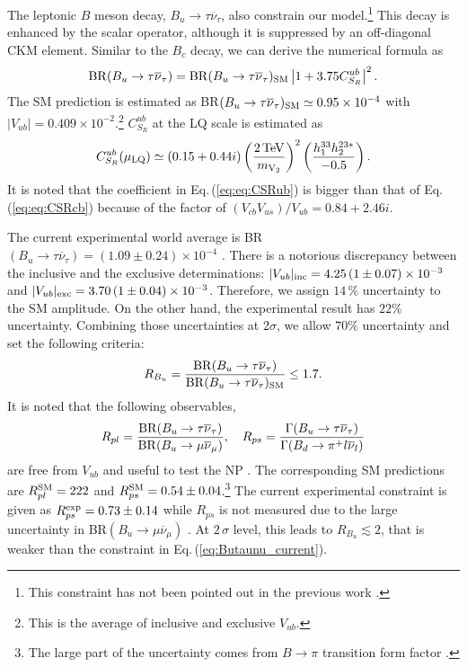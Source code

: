 \documentclass[12pt, a4paper]{article}
\numberwithin{equation}{section} %
\newcommand{\ov}{\overline}
\newcommand{\1}{\mbox{1}\hspace{-0.25em}\mbox{l}}
\begin{document}
The leptonic $B$ meson decay, $B_u\to \tau\ov\nu_\tau$, also constrain our model.\footnote{ This constraint has not been pointed out in the previous work \cite{Cheung:2022zsb}.}
This decay is enhanced by the scalar operator, although it is suppressed by an off-diagonal CKM element.
Similar to the $B_c$ decay, we can derive the numerical formula as 
\begin{align}
 \label{eq:Bu}
{\rm{BR}}(B_u\to \tau\overline\nu_\tau) ={\rm{BR}}(B_u\to \tau\overline\nu_\tau)_{\rm SM}\left| 1 + 3.75 C^{ub}_{S_R} \right|^2.
\end{align}
The SM prediction is estimated as BR$(B_u\to \tau\ov\nu_\tau)_{\rm SM}\simeq 0.95 \times 10^{-4}$ with $|V_{ub}|=0.409\times 10^{-2}$.\footnote{This is the average of inclusive and exclusive $V_{ub}$.}
$C_{S_R}^{ub}$ at the LQ scale is estimated as
\begin{align}
    C_{S_R}^{ub}(\mu_{\rm{LQ}})\simeq(0.15+0.44i)\left(\frac{2\,{\rm{TeV}}}{m_{\rm{V}_2}}\right)^2\left(\frac{h_1^{33}h_2^{23*}}{-0.5}\right).
    \label{eq:eq:CSRub}
\end{align}
It is noted that the coefficient in Eq.\,(\ref{eq:eq:CSRub}) is bigger than that of Eq.\,(\ref{eq:eq:CSRcb}) because of the factor of $(V_{cb} V_{us})/V_{ub}=0.84+2.46i$.

The current experimental world average is BR$(B_u\to \tau\overline\nu_\tau)=(1.09\pm0.24)\times 10^{-4}$ \cite{PDG2022}.
There is a notorious discrepancy between the inclusive and the exclusive determinations:
$|V_{ub}|_{\rm{inc}}=4.25\,(1\pm0.07)\times 10^{-3}$ and  $|V_{ub}|_{\rm{exc}}=3.70\,(1\pm0.04)\times 10^{-3}$. 
Therefore, we assign $14\,\%$ uncertainty to the SM amplitude.
On the other hand, the experimental result has $22\%$ uncertainty.
Combining those uncertainties at $2\sigma$, we allow $70\%$ uncertainty and set the following criteria:
\begin{align}
R_{B_u}=\frac{{\rm{BR}}(B_u\to \tau\ov\nu_\tau)}{{\rm{BR}}(B_u\to \tau\ov\nu_\tau)_{\rm{SM}}}\le1.7.
\label{eq:Butaunu_current}
\end{align}
It is noted that the following observables, 
\begin{align}
    R_{pl}=\frac{{\rm{BR}}(B_u\to\tau\ov\nu_\tau)}{{\rm{BR}}(B_u\to\mu\ov\nu_\mu)},~~~R_{ps}=\frac{\Gamma(B_u\to\tau\ov\nu_\tau)}{\Gamma(B_d\to\pi^+l\ov\nu_l)}
\end{align}
are free from $V_{ub}$ and useful to test the NP \cite{Tanaka:2016ijq}. The corresponding SM predictions are $R_{pl}^{\rm{SM}}=222$ and $R_{ps}^{\rm{SM}}=0.54\pm0.04$.\footnote{The large part of the uncertainty comes from $B\to \pi$ transition form factor \cite{Tanaka:2016ijq}.}
The current experimental constraint is given as $R_{ps}^{\rm{exp}}=0.73\pm0.14$ while $R_{ps}$ is not measured due to the large uncertainty in BR$(B_u\to\mu\ov\nu_\mu)$ \cite{Kou:2018nap}.
At $2\,\sigma$ level, this leads to $R_{B_u}\lesssim 2$, that is weaker than the constraint in Eq.\,(\ref{eq:Butaunu_current}).
\end{document}
